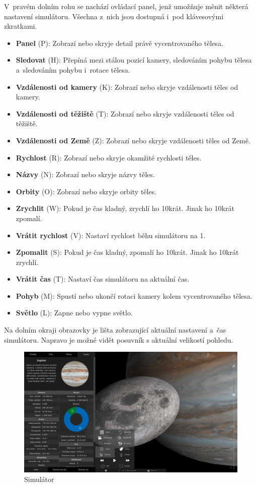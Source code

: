 \documentclass[a4paper,12pt]{article}
\begin{document}
V~pravém dolním rohu se nachází ovládací panel, jenž umožňuje měnit některá nastavení simulátoru. Všechna z~nich jsou dostupná i~pod klávesovými zkratkami.

\begin{itemize}
\item \textbf{Panel} (P): Zobrazí nebo skryje detail právě vycentrovaného tělesa.
\item \textbf{Sledovat} (H): Přepíná mezi stálou pozicí kamery, sledováním pohybu tělesa a~sledováním pohybu i~rotace tělesa.
\item \textbf{Vzdálenosti od kamery} (K): Zobrazí nebo skryje vzdálenosti těles od kamery.
\item \textbf{Vzdálenosti od těžiště} (T): Zobrazí nebo skryje vzdálenosti těles od těžiště.
\item \textbf{Vzdálenosti od Země} (Z): Zobrazí nebo skryje vzdálenosti těles od Země.
\item \textbf{Rychlost} (R): Zobrazí nebo skryje okamžité rychlosti těles.
\item \textbf{Názvy} (N): Zobrazí nebo skryje názvy těles.
\item \textbf{Orbity} (O): Zobrazí nebo skryje orbity těles.
\item \textbf{Zrychlit} (W): Pokud je čas kladný, zrychlí ho 10krát. Jinak ho 10krát zpomalí.
\item \textbf{Vrátit rychlost} (V): Nastaví rychlost běhu simulátoru na 1.
\item \textbf{Zpomalit} (S): Pokud je čas kladný, zpomalí ho 10krát. Jinak ho 10krát zrychlí.
\item \textbf{Vrátit čas} (T): Nastaví čas simulátoru na aktuální čas.
\item \textbf{Pohyb} (M): Spustí nebo ukončí rotaci kamery kolem vycentrovaného tělesa.
\item \textbf{Světlo} (L): Zapne nebo vypne světlo.
\end{itemize}

Na dolním okraji obrazovky je lišta zobrazující aktuální nastavení a~čas simulátoru. Napravo je možné vidět posuvník s aktuální velikostí pohledu.

\begin{figure}[H]
\begin{center}
\includegraphics[width=450pt]{Images/Simulator.png}
\caption{Simulátor}
\end{center}
\end{figure}
\end{document}
